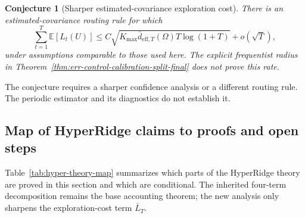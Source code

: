 \documentclass{article} %
\newtheorem{conjecture}{Conjecture}
\begin{document}
\begin{conjecture}[Sharper estimated-covariance exploration cost]
\label{conj:err-control}
There is an estimated-covariance routing rule for which
\begin{equation}
\label{eq:hyper-conj-err}
\sum_{t=1}^{T}\mathbb{E}[L_t(U)]
\le C\sqrt{
K_{\max}\bar d_{\mathrm{eff},T}(\Omega)T\log(1+T)}
+ o(\sqrt{T}),
\end{equation}
under assumptions comparable to those used here. The explicit frequentist
radius in Theorem~\ref{thm:err-control-calibration-split-final} does not prove
this rate.
\end{conjecture}

The conjecture requires a sharper confidence analysis or a different routing
rule. The periodic estimator and its diagnostics do not establish it.

\subsection{Map of HyperRidge claims to proofs and open steps}
\label{sec:theory-hyper-map}

Table~\ref{tab:hyper-theory-map} summarizes which parts of the HyperRidge theory are proved in this section and which are conditional.  The inherited four-term decomposition remains the base accounting theorem; the new analysis only sharpens the exploration-cost term \(\bar L_T\).
\end{document}
